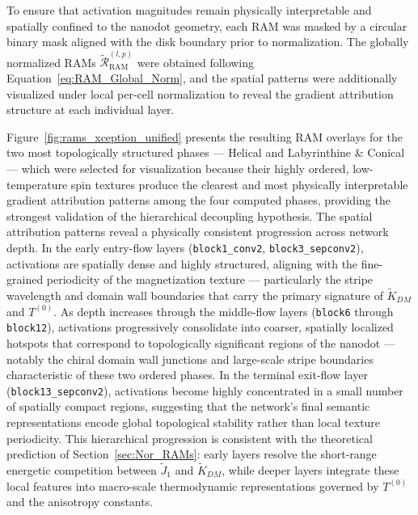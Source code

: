 \documentclass[a4paper,fleqn]{cas-sc}
\begin{document}
To ensure that activation magnitudes remain physically
interpretable and spatially confined to the nanodot
geometry, each RAM was masked by a circular binary mask
aligned with the disk boundary prior to normalization.
The globally normalized RAMs
$\tilde{\mathcal{R}}_{\text{RAM}}^{(l,p)}$ were obtained
following Equation~\ref{eq:RAM_Global_Norm}, and the
spatial patterns were additionally visualized under local
per-cell normalization to reveal the gradient attribution
structure at each individual layer.

Figure~\ref{fig:rams_xception_unified} presents the
resulting RAM overlays for the two most topologically
structured phases --- Helical and Labyrinthine \& Conical
--- which were selected for visualization because their
highly ordered, low-temperature spin textures produce the
clearest and most physically interpretable gradient
attribution patterns among the four computed phases,
providing the strongest validation of the hierarchical
decoupling hypothesis. The spatial attribution patterns
reveal a physically consistent progression across network
depth. In the early entry-flow layers
(\texttt{block1\_conv2}, \texttt{block3\_sepconv2}),
activations are spatially dense and highly structured,
aligning with the fine-grained periodicity of the
magnetization texture --- particularly the stripe wavelength
and domain wall boundaries that carry the primary signature
of $\tilde{K}_{DM}$ and $T^{(0)}$. As depth increases
through the middle-flow layers (\texttt{block6} through
\texttt{block12}), activations progressively consolidate
into coarser, spatially localized hotspots that correspond
to topologically significant regions of the nanodot ---
notably the chiral domain wall junctions and large-scale
stripe boundaries characteristic of these two ordered
phases. In the terminal exit-flow layer
(\texttt{block13\_sepconv2}), activations become highly
concentrated in a small number of spatially compact regions,
suggesting that the network's final semantic representations
encode global topological stability rather than local
texture periodicity. This hierarchical progression is
consistent with the theoretical prediction of
Section~\ref{sec:Nor_RAMs}: early layers resolve the
short-range energetic competition between $\tilde{J}_1$
and $\tilde{K}_{DM}$, while deeper layers integrate these
local features into macro-scale thermodynamic
representations governed by $T^{(0)}$ and the
anisotropy constants.
\end{document}
